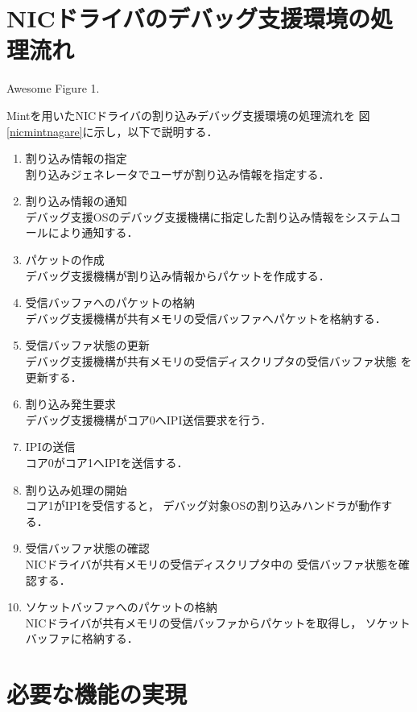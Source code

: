 \documentclass[tanilab-enum]{graduate}
\begin{document}
\section{NICドライバのデバッグ支援環境の処理流れ}
{Awesome Figure 1.}

Mintを用いたNICドライバの割り込みデバッグ支援環境の処理流れを
図\ref{nicmintnagare}に示し，以下で説明する．
\begin{enumerate}
    \item 割り込み情報の指定\\
        割り込みジェネレータでユーザが割り込み情報を指定する．
    \item 割り込み情報の通知\\
        デバッグ支援OSのデバッグ支援機構に指定した割り込み情報をシステムコールにより通知する．
    \item パケットの作成\\
        デバッグ支援機構が割り込み情報からパケットを作成する．
    \item 受信バッファへのパケットの格納\\
        デバッグ支援機構が共有メモリの受信バッファへパケットを格納する．
    \item 受信バッファ状態の更新\\
        デバッグ支援機構が共有メモリの受信ディスクリプタの受信バッファ状態
        を更新する．
    \item 割り込み発生要求\\
        デバッグ支援機構がコア0へIPI送信要求を行う．
    \item IPIの送信\\
        コア0がコア1へIPIを送信する．
    \item 割り込み処理の開始\\
        コア1がIPIを受信すると，
        デバッグ対象OSの割り込みハンドラが動作する．
    \item 受信バッファ状態の確認\\
        NICドライバが共有メモリの受信ディスクリプタ中の
        受信バッファ状態を確認する．
    \item ソケットバッファへのパケットの格納\\
        NICドライバが共有メモリの受信バッファからパケットを取得し，
        ソケットバッファに格納する．
\end{enumerate}

\section{必要な機能の実現}
\end{document}
